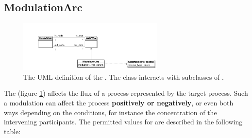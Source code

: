 



\subsection{ModulationArc}
\label{defn:ModulationArc}

\begin{figure}[htb]
  \centering
  \includegraphics[width = 0.65\textwidth]{images/modulationarcuml}
  \caption{The UML definition of the . The class interacts with
    subclasses of .}
  \label{fig:modulationarcuml}
\end{figure}
 
The  (figure \ref{fig:modulationarcuml})
affects the flux of a process represented by the target process. Such
a modulation can affect the process \textbf{positively or negatively},
or even both ways depending on the conditions, for instance the
concentration of the intervening participants. The permitted values
for  are described in the following table:

